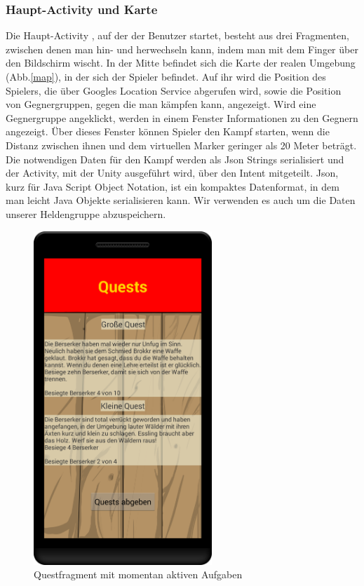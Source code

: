 \documentclass[extern,palatino]{cgBA}
\begin{document}
\subsubsection{Haupt-Activity und Karte}Die Haupt-Activity , auf der der Benutzer startet, besteht aus drei Fragmenten, zwischen denen man hin- und herwechseln kann, indem man mit dem Finger über den Bildschirm wischt. In der Mitte befindet sich die Karte der realen Umgebung (Abb.\ref{map}), in der sich der Spieler befindet. Auf ihr wird die Position des Spielers, die über Googles Location Service abgerufen wird, sowie die Position von Gegnergruppen, gegen die man kämpfen kann, angezeigt. Wird eine Gegnergruppe angeklickt, werden in einem Fenster Informationen zu den Gegnern angezeigt. Über dieses Fenster können Spieler den Kampf starten, wenn die Distanz zwischen ihnen und dem virtuellen Marker geringer als 20 Meter beträgt. Die notwendigen Daten für den Kampf werden als Json Strings serialisiert und der Activity, mit der Unity ausgeführt wird, über den Intent mitgeteilt. Json, kurz für Java Script Object Notation, ist ein kompaktes Datenformat, in dem man leicht Java Objekte serialisieren kann. Wir verwenden es auch um die Daten unserer Heldengruppe abzuspeichern.	
\newpage
\begin{figure}[H] 
	\centering
	\includegraphics[width=0.6\textwidth]{questfragment.png}
	\caption{Questfragment mit momentan aktiven Aufgaben}
	\label{questfragment}
\end{figure}
\end{document}
